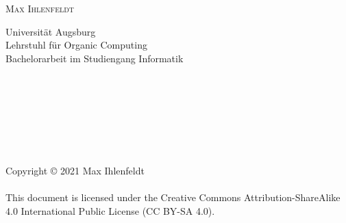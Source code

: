 \begin{verbatim}










\end{verbatim}

\begin{center}
	\huge{\textbf{\titleDocument}}
\end{center}

\begin{center}
	\Large{\textbf{\\\\}}
\end{center}

\vspace{.5em}
\begin{center}
	\large{\textsc{Max Ihlenfeldt}}
\end{center}

\begin{center}
	\large{
		Universität Augsburg \\
		Lehrstuhl für Organic Computing \\
		Bachelorarbeit im Studiengang Informatik
	}
\end{center}

\begin{verbatim}








\end{verbatim}

\begin{center}
	\large{
		Copyright \copyright{} 2021 Max Ihlenfeldt \\
		\phantom{} \\
		This document is licensed under the Creative Commons Attribution-ShareAlike 4.0 International Public License (CC BY-SA 4.0).
	}
\end{center}